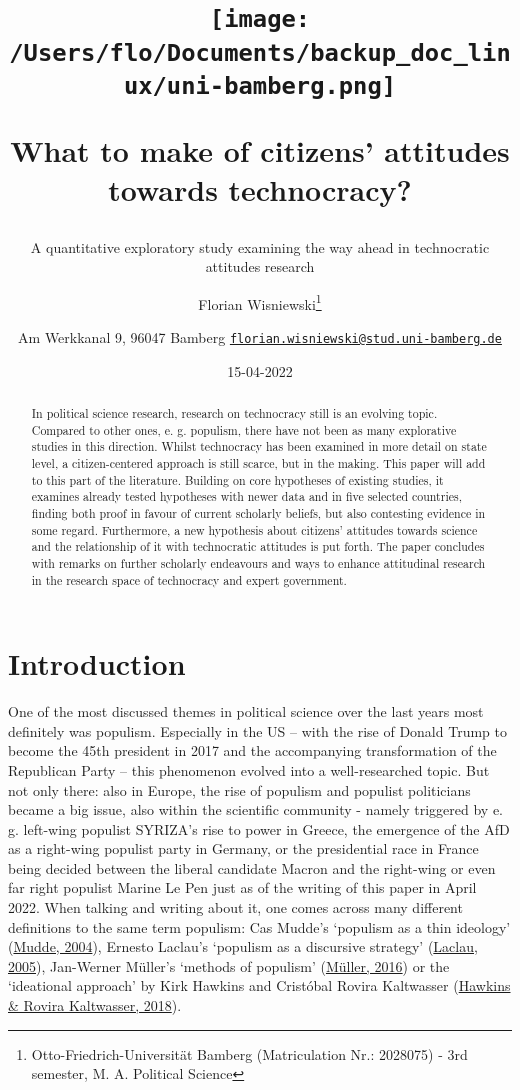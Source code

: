 \documentclass[
  12pt,
  english,
]{article}
\title{\texttt{[image: /Users/flo/Documents/backup\_doc\_linux/uni-bamberg.png]}

What to make of citizens' attitudes towards technocracy?}
\subtitle{A quantitative exploratory study examining the way ahead in
technocratic attitudes research}
\author{Florian Wisniewski\footnote{Otto-Friedrich-Universität Bamberg
  (Matriculation Nr.: 2028075) - 3rd semester, M. A. Political Science} \and Am
Werkkanal 9, 96047 Bamberg \textbar{}
\href{mailto:florian.wisniewski@stud.uni-bamberg.de}{\nolinkurl{florian.wisniewski@stud.uni-bamberg.de}}}
\date{15-04-2022}
\begin{document}
\maketitle
\begin{abstract}
In political science research, research on technocracy still is an
evolving topic. Compared to other ones, e. g. populism, there have not
been as many explorative studies in this direction. Whilst technocracy
has been examined in more detail on state level, a citizen-centered
approach is still scarce, but in the making. This paper will add to this
part of the literature. Building on core hypotheses of existing studies,
it examines already tested hypotheses with newer data and in five
selected countries, finding both proof in favour of current scholarly
beliefs, but also contesting evidence in some regard. Furthermore, a new
hypothesis about citizens' attitudes towards science and the
relationship of it with technocratic attitudes is put forth. The paper
concludes with remarks on further scholarly endeavours and ways to
enhance attitudinal research in the research space of technocracy and
expert government.
\end{abstract}

\newpage{}

\tableofcontents

\newpage{}

\hypertarget{introduction}{%
\section{Introduction}\label{introduction}}

One of the most discussed themes in political science over the last
years most definitely was populism. Especially in the US -- with the
rise of Donald Trump to become the 45th president in 2017 and the
accompanying transformation of the Republican Party -- this phenomenon
evolved into a well-researched topic. But not only there: also in
Europe, the rise of populism and populist politicians became a big
issue, also within the scientific community - namely triggered by e. g.
left-wing populist SYRIZA's rise to power in Greece, the emergence of
the AfD as a right-wing populist party in Germany, or the presidential
race in France being decided between the liberal candidate Macron and
the right-wing or even far right populist Marine Le Pen just as of the
writing of this paper in April 2022. When talking and writing about it,
one comes across many different definitions to the same term populism:
Cas Mudde's `populism as a thin ideology'
(\protect\hyperlink{ref-mudde2004populist}{Mudde, 2004}), Ernesto
Laclau's `populism as a discursive strategy'
(\protect\hyperlink{ref-laclau2005populist}{Laclau, 2005}), Jan-Werner
Müller's `methods of populism'
(\protect\hyperlink{ref-muxfcller2016populismus}{Müller, 2016}) or the
`ideational approach' by Kirk Hawkins and Cristóbal Rovira Kaltwasser
(\protect\hyperlink{ref-hawkins2018ideational}{Hawkins \& Rovira
Kaltwasser, 2018}).
\end{document}
